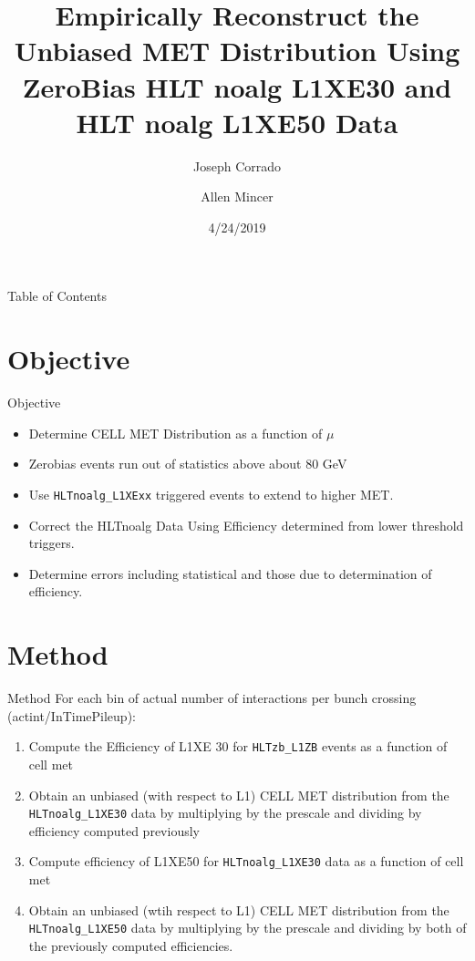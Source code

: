 \documentclass[]{beamer}
\title{Empirically Reconstruct the Unbiased MET Distribution Using ZeroBias HLT noalg L1XE30 and HLT noalg L1XE50 Data}
\author{Joseph Corrado \and Allen Mincer}                 %
\institute{New York University}      %
\date{4/24/2019}                    %
\begin{document}
\begin{frame}
  \titlepage
\end{frame}
\begin{frame}{Table of Contents}
        \tableofcontents
\end{frame}
\section{Objective}
\begin{frame}{Objective}
\begin{itemize}
        \item Determine CELL MET Distribution as a function of $\mu$
        \item Zerobias events run out of statistics above about 80 GeV
        \item Use \texttt{HLTnoalg\_L1XExx} triggered events to extend to higher MET.
        \item Correct the HLTnoalg Data Using Efficiency determined from lower threshold triggers.
        \item Determine errors including statistical and those due to determination of efficiency.
\end{itemize}
\end{frame}
\section{Method}
\begin{frame}{Method}
For each bin of actual number of interactions per bunch crossing (actint/InTimePileup):
\begin{enumerate}
        \item Compute the Efficiency of L1XE 30 for \texttt{HLTzb\_L1ZB} events as a function of cell met
        \item Obtain an unbiased (with respect to L1) CELL MET distribution from the \texttt{HLTnoalg\_L1XE30} data by multiplying by the prescale and dividing by efficiency computed previously
        \item Compute efficiency of L1XE50 for \texttt{HLTnoalg\_L1XE30} data as a function of cell met
        \item Obtain an unbiased (wtih respect to L1) CELL MET distribution from the \texttt{HLTnoalg\_L1XE50} data by multiplying by the prescale and dividing by both of the previously computed efficiencies.
\end{enumerate}
\end{frame}
\end{document}
